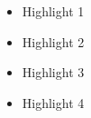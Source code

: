 \begin{highlights}
\begin{itemize}
       \item Highlight 1 
       \item Highlight 2
       \item Highlight 3
       \item Highlight 4
\end{itemize}
\end{highlights}
